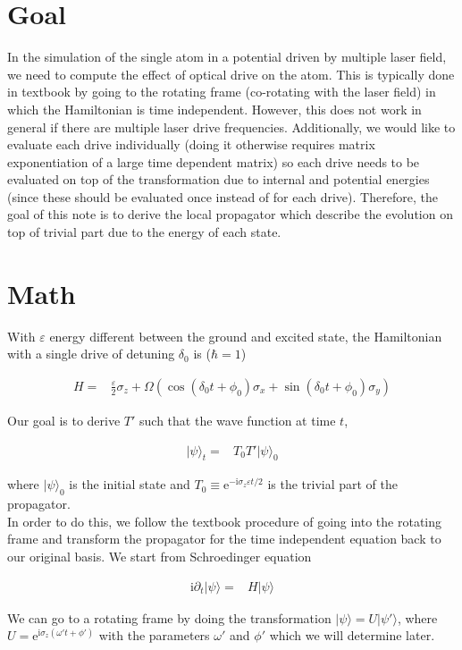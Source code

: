 \documentclass[10pt,fleqn]{article}
\newcommand{\ue}{\mathrm{e}}
\newcommand{\ui}{\mathrm{i}}
\newcommand{\eqar}[1]
{
  \begin{align*}
    #1
  \end{align*}
}
\newcommand{\paren}[1]{{\left({#1}\right)}}
\begin{document}
\section{Goal}
In the simulation of the single atom in a potential driven by multiple laser
field, we need to compute the effect of optical drive on the atom. This is
typically done in textbook by going to the rotating frame (co-rotating with the
laser field) in which the Hamiltonian is time independent. However, this does
not work in general if there are multiple laser drive frequencies. Additionally,
we would like to evaluate each drive individually (doing it otherwise requires
matrix exponentiation of a large time dependent matrix) so each drive needs to
be evaluated on top of the transformation due to internal and potential
energies (since these should be evaluated once instead of for each drive).
Therefore, the goal of this note is to derive the local propagator which
describe the evolution on top of trivial part due to the energy of each
state.

\section{Math}

With $\varepsilon$ energy different between the ground and excited state, the
Hamiltonian with a single drive of detuning $\delta_0$ is ($\hbar = 1$)

\eqar{
  H=&\frac\varepsilon2\sigma_z + \Omega\paren{\cos(\delta_0t+\phi_0)\sigma_x+\sin(\delta_0t+\phi_0)\sigma_y}
}

Our goal is to derive $T'$ such that the wave function at time $t$,

\eqar{
  |\psi\rangle_t=&T_0T'|\psi\rangle_0
}

where $|\psi\rangle_0$ is the initial state and $T_0\equiv\ue^{-\ui\sigma_z\varepsilon t/2}$ is the trivial part of the propagator.\\

In order to do this, we follow the textbook procedure of going into the rotating frame and transform the propagator for the time independent equation back to our original basis. We start from Schroedinger equation

\eqar{
  \ui\partial_t|\psi\rangle=&H|\psi\rangle
}

We can go to a rotating frame by doing the transformation
$|\psi\rangle=U|\psi'\rangle$, where $U=\ue^{\ui\sigma_z(\omega't+\phi')}$ with the
parameters $\omega'$ and $\phi'$ which we will determine later.
\end{document}

